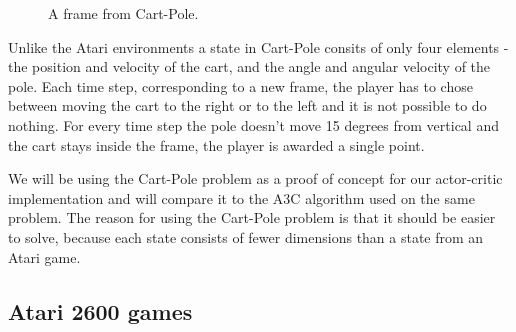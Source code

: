 \documentclass[11pt]{article}
\begin{document}
\begin{figure}[!h]
    \centering
    \caption{A frame from Cart-Pole.}
    \label{fig:cartpole}
\end{figure}

Unlike the Atari environments a state in Cart-Pole consits of only four elements - the position and velocity of the cart, and the
angle and angular velocity of the pole.
Each time step, corresponding to a new frame, the player has to chose between moving the cart to the right or to the left and it is not possible
to do nothing.
For every time step the pole doesn't move 15 degrees from vertical and
the cart stays inside the frame, the player is awarded a single point.

We will be using the Cart-Pole problem as a proof of concept for our actor-critic implementation and will
compare it to the A3C algorithm used on the same problem.
The reason for using the Cart-Pole problem is that it should be easier
to solve, because each state consists of fewer dimensions than a state
from an Atari game.


\subsection{Atari 2600 games}
\end{document}
